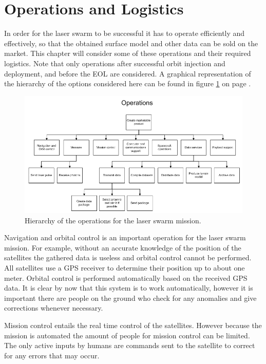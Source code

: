 \section{Operations and Logistics}
\label{OperationsLogistics}

In order for the laser swarm to be successful it has to operate efficiently and effectively, so that the obtained surface model and other data can be sold on the market. This chapter will consider some of these operations and their required logistics. Note that only operations after successful orbit injection and deployment, and before the \ac{EOL} are considered. A graphical representation of the hierarchy of the options considered here can be found in figure \ref{fig:OpsHier} on page \pageref{fig:OpsHier}.

\begin{figure}
\centering
\includegraphics[width=1.0\textwidth, angle=0]{chapters/img/OpsHierarchy.png}
\caption{Hierarchy of the operations for the laser swarm mission.}
\label{fig:OpsHier}
\end{figure}

Navigation and orbital control is an important operation for the laser swarm mission. For example, without an accurate knowledge of the position of the satellites the gathered data is useless and orbital control cannot be performed. All satellites use a \acs{GPS} receiver to determine their position up to about one meter. Orbital control is performed automatically based on the received \acs{GPS} data. It is clear by now that this system is to work automatically, however it is important there are people on the ground who check for any anomalies and give corrections whenever necessary.

Mission control entails the real time control of the satellites. However because the mission is automated the amount of people for mission control can be limited. The only active inputs by humans are commands sent to the satellite to correct for any errors that may occur.

